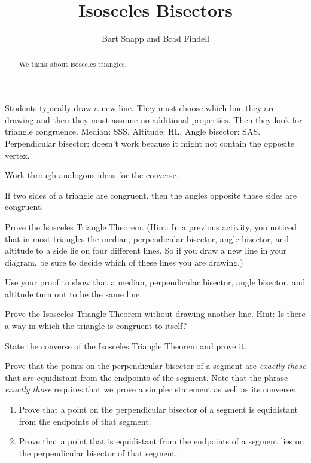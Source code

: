 \documentclass[nooutcomes]{ximera}
\title{Isosceles Bisectors}
\author{Bart Snapp and Brad Findell}
\begin{document}
\begin{abstract}
  We think about isosceles triangles.
\end{abstract}
\maketitle

\begin{teachingnote}
Students typically draw a new line. They must choose which line they are drawing and then they must assume no additional properties.  Then they look for triangle congruence.  Median: SSS.  Altitude: HL.  Angle bisector: SAS. Perpendicular bisector: doesn't work because it might not contain the opposite vertex.  

Work through analogous ideas for the converse. 
\end{teachingnote}

\begin{theorem}
If two sides of a triangle are congruent, then the angles opposite those sides are congruent. 
\end{theorem}

\begin{problem}
Prove the Isosceles Triangle Theorem.  (Hint: In a previous activity, you noticed that in most triangles the median, perpendicular bisector, angle bisector, and altitude to a side lie on four different lines.  So if you draw a new line in your diagram, be sure to decide which of these lines you are drawing.)
\end{problem}
\vfill

\begin{problem}
Use your proof to show that a median, perpendicular bisector, angle bisector, and altitude turn out to be the same line.
\end{problem}
\vfill
\newpage

\begin{problem}
Prove the Isosceles Triangle Theorem without drawing another line.  Hint:  Is there a way in which the triangle is congruent to itself? 
\end{problem}
\vfill

\begin{problem}
State the converse of the Isosceles Triangle Theorem and prove it.  
\end{problem}
\vfill
\newpage
\begin{problem}
Prove that the points on the perpendicular bisector of a segment are \emph{exactly those} that are equidistant from the endpoints of the segment.  Note that the phrase \emph{exactly those} requires that we prove a simpler statement as well as its converse:   
\begin{enumerate}
\item Prove that a point on the perpendicular bisector of a segment is equidistant from the endpoints of that segment.
\item Prove that a point that is equidistant from the endpoints of a segment lies on the perpendicular bisector of that segment.
\end{enumerate}
\end{problem}
\end{document}
